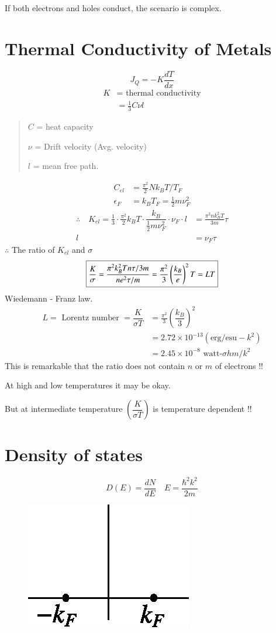 If both electrons and holes conduct, the scenario is complex.

\section*{Thermal Conductivity of Metals}
$$
J_{Q}=-K\dfrac{dT}{dx}
$$
\begin{align*}
K &= \text{ thermal conductivity}\\
 &= \frac{1}{3}C\nu l
\end{align*}
\begin{quote}
$C$ = heat capacity

$\nu$ = Drift velocity (Avg. velocity)

$l$ = mean free path.
\end{quote}
\begin{align*}
C_{el} &= \frac{\pi^{2}}{2}Nk_{B}T/T_{F}\\
\epsilon_{F} &= k_{B}T_{F}=\frac{1}{2}m\nu^{2}_{F}
\end{align*}
\begin{align*}
\therefore\quad K_{el}=\frac{1}{3}\cdot \frac{\pi^{2}}{2}k_{B}T\cdot \dfrac{k_{B}}{\frac{1}{2}m\nu^{2}_{F}}\cdot \nu_{F}\cdot l &= \frac{\pi^{2}nk^{2}_{B}T}{3m}\tau\\
l &= \nu_{F}\tau
\end{align*}
$\therefore$ The ratio of $K_{el}$ and $\sigma$
$$
\fbox{$\dfrac{K}{\sigma}=\dfrac{\pi^{2}k^{2}_{B}Tn\tau/3m}{ne^{2}\tau/m}=\dfrac{\pi^{2}}{3}\left(\dfrac{k_{B}}{e}\right)^{2}T=LT$}
$$
Wiedemann - Franz law.
\begin{align*}
L = \text{ Lorentz number } =\dfrac{K}{\sigma T} &= \frac{\pi^{2}}{3}\left(\dfrac{k_{B}}{3}\right)^{2}\\
&= 2.72\times 10^{-13}(\text{erg}/\text{esu}-k^{2})\\
&= 2.45\times 10^{-8}\text{ watt-}\sigma hm/k^{2}
\end{align*}
This is remarkable that the ratio does not contain $n$ or $m$ of electrons !!

At high and low temperatures it may be okay.

But at intermediate temperature $\left(\dfrac{K}{\sigma T}\right)$ is temperature dependent !!

\section*{Density of states}
$$
D(E)=\dfrac{dN}{dE}\quad E=\dfrac{\hbar^{2}k^{2}}{2m}
$$
\begin{figure}[H]
\centering
\includegraphics{images/lecture25/fig3a.eps}
\end{figure}


